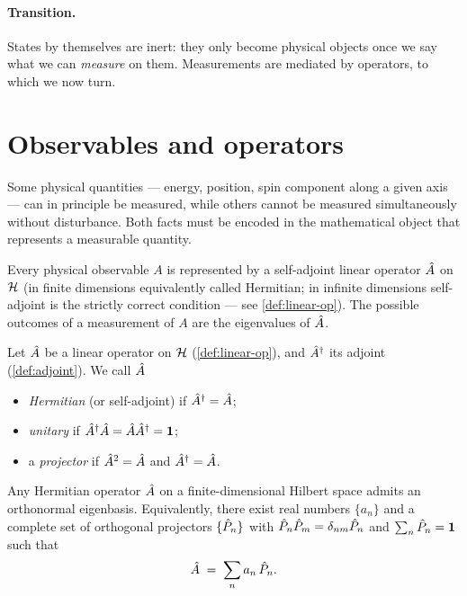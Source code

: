 \paragraph{Transition.}
States by themselves are inert: they only become physical objects
once we say what we can \emph{measure} on them. Measurements are
mediated by operators, to which we now turn.

\section{Observables and operators}
\label{sec:operators}

\begin{phenomenon}
Some physical quantities --- energy, position, spin component along
a given axis --- can in principle be measured, while others cannot
be measured simultaneously without disturbance. Both facts must be
encoded in the mathematical object that represents a measurable
quantity.
\end{phenomenon}

\begin{postulate}[Observables]
\label{post:observables}
Every physical observable $A$ is represented by a self-adjoint
linear operator $\hat{A}$ on $\mathcal{H}$ (in finite dimensions
equivalently called Hermitian; in infinite dimensions self-adjoint
is the strictly correct condition --- see \cref{def:linear-op}).
The possible outcomes of a measurement of $A$ are the eigenvalues
of $\hat{A}$.
\end{postulate}

\begin{definition}
\label{def:operator-types}
Let $\hat{A}$ be a linear operator on $\mathcal{H}$
(\cref{def:linear-op}), and $\hat{A}^\dagger$ its adjoint
(\cref{def:adjoint}). We call $\hat{A}$
\begin{itemize}
  \item \emph{Hermitian} (or self-adjoint) if $\hat{A}^\dagger=\hat{A}$;
  \item \emph{unitary} if $\hat{A}^\dagger\hat{A}=\hat{A}\hat{A}^\dagger=\mathbf{1}$;
  \item a \emph{projector} if $\hat{A}^2=\hat{A}$ and $\hat{A}^\dagger=\hat{A}$.
\end{itemize}
\end{definition}

\begin{theorem}
\label{thm:spectral}
Any Hermitian operator $\hat{A}$ on a finite-dimensional Hilbert
space admits an orthonormal eigenbasis. Equivalently, there exist
real numbers $\{a_n\}$ and a complete set of orthogonal projectors
$\{\hat{P}_n\}$ with $\hat{P}_n\hat{P}_m=\delta_{nm}\hat{P}_n$ and
$\sum_n\hat{P}_n=\mathbf{1}$ such that
\begin{equation}
\label{eq:spectral-decomp}
\hat{A} \;=\; \sum_n a_n\,\hat{P}_n.
\end{equation}
\end{theorem}

